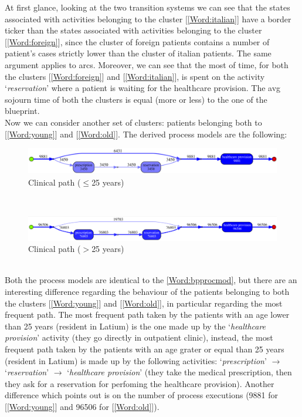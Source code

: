 At first glance, looking at the two transition systems we can see that the states associated with activities belonging to the cluster [\ref{Word:italian}] have a border ticker than the states associated with activities belonging to the cluster [\ref{Word:foreign}], since the cluster of foreign patients contains a number of
patient's cases strictly lower than the cluster of italian patients. The same argument applies to arcs. Moreover, we can see that the most of time, for both the clusters [\ref{Word:foreign}] and [\ref{Word:italian}], is spent on the activity `\textit{reservation}' where a patient is waiting for the healthcare provision. %
The avg sojourn time of both the clusters is equal (more or less) to the one of the blueprint.\\
Now we can consider another set of clusters: patients belonging both to [\ref{Word:young}] and [\ref{Word:old}]. The derived process models are the following:
\begin{figure} [htbp]
\includegraphics[width=\textwidth]{AmbulatoriInductiveVisualMinerYoungs}
\caption{Clinical path ($\leq$25 years)}
\end{figure}\\
\begin{figure} [htbp]
\includegraphics[width=\textwidth]{AmbulatoriInductiveVisualMinerOlds}
\caption{Clinical path ($>$25 years)}
\end{figure}\\
Both the process models are identical to the \ref{Word:bpprocmod}, but there are an interesting difference regarding the behaviour of the patients belonging to both the clusters [\ref{Word:young}] and [\ref{Word:old}], in particular regarding the most frequent path. The most frequent path taken by the patients with an age lower than 25 years (resident in Latium) is the one made up by the `\textit{healthcare provision}' activity (they go directly in outpatient clinic), instead, the most frequent path taken by the patients with an age grater or equal than 25 years (resident in Latium) is made up by the following activities: `\textit{prescription}' $ \rightarrow $ `\textit{reservation}' $ \rightarrow$ `\textit{healthcare provision}' (they take the medical prescription, then they ask for a reservation for perfoming the healthcare provision). Another difference which points out is on the number of process executions (9881 for [\ref{Word:young}] and 96506 for [\ref{Word:old}]).
